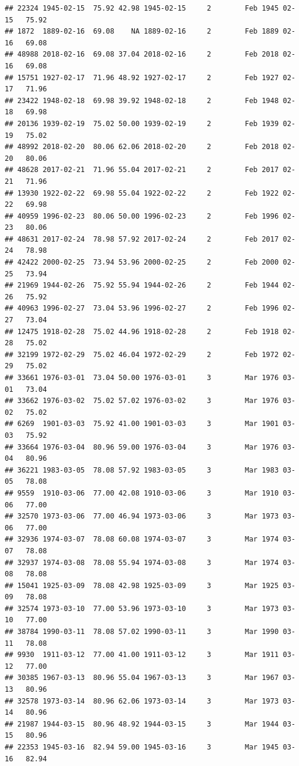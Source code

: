 \documentclass{article}\usepackage[]{graphicx}\usepackage[]{color}
\makeatletter
\newenvironment{kframe}{%
 \def\at@end@of@kframe{}%
 \ifinner\ifhmode%
  \def\at@end@of@kframe{\end{minipage}}%
  \begin{minipage}{\columnwidth}%
 \fi\fi%
 \def\FrameCommand##1{\hskip\@totalleftmargin \hskip-\fboxsep
 \colorbox{shadecolor}{##1}\hskip-\fboxsep
     \hskip-\linewidth \hskip-\@totalleftmargin \hskip\columnwidth}%
 \MakeFramed {\advance\hsize-\width
   \@totalleftmargin\z@ \linewidth\hsize
   \@setminipage}}%
 {\par\unskip\endMakeFramed%
 \at@end@of@kframe}
\newenvironment{knitrout}{}{} %
\makeatother
\begin{document}
\begin{knitrout}
\begin{kframe}
\begin{verbatim}
## 22324 1945-02-15  75.92 42.98 1945-02-15     2        Feb 1945 02-15   75.92
## 1872  1889-02-16  69.08    NA 1889-02-16     2        Feb 1889 02-16   69.08
## 48988 2018-02-16  69.08 37.04 2018-02-16     2        Feb 2018 02-16   69.08
## 15751 1927-02-17  71.96 48.92 1927-02-17     2        Feb 1927 02-17   71.96
## 23422 1948-02-18  69.98 39.92 1948-02-18     2        Feb 1948 02-18   69.98
## 20136 1939-02-19  75.02 50.00 1939-02-19     2        Feb 1939 02-19   75.02
## 48992 2018-02-20  80.06 62.06 2018-02-20     2        Feb 2018 02-20   80.06
## 48628 2017-02-21  71.96 55.04 2017-02-21     2        Feb 2017 02-21   71.96
## 13930 1922-02-22  69.98 55.04 1922-02-22     2        Feb 1922 02-22   69.98
## 40959 1996-02-23  80.06 50.00 1996-02-23     2        Feb 1996 02-23   80.06
## 48631 2017-02-24  78.98 57.92 2017-02-24     2        Feb 2017 02-24   78.98
## 42422 2000-02-25  73.94 53.96 2000-02-25     2        Feb 2000 02-25   73.94
## 21969 1944-02-26  75.92 55.94 1944-02-26     2        Feb 1944 02-26   75.92
## 40963 1996-02-27  73.04 53.96 1996-02-27     2        Feb 1996 02-27   73.04
## 12475 1918-02-28  75.02 44.96 1918-02-28     2        Feb 1918 02-28   75.02
## 32199 1972-02-29  75.02 46.04 1972-02-29     2        Feb 1972 02-29   75.02
## 33661 1976-03-01  73.04 50.00 1976-03-01     3        Mar 1976 03-01   73.04
## 33662 1976-03-02  75.02 57.02 1976-03-02     3        Mar 1976 03-02   75.02
## 6269  1901-03-03  75.92 41.00 1901-03-03     3        Mar 1901 03-03   75.92
## 33664 1976-03-04  80.96 59.00 1976-03-04     3        Mar 1976 03-04   80.96
## 36221 1983-03-05  78.08 57.92 1983-03-05     3        Mar 1983 03-05   78.08
## 9559  1910-03-06  77.00 42.08 1910-03-06     3        Mar 1910 03-06   77.00
## 32570 1973-03-06  77.00 46.94 1973-03-06     3        Mar 1973 03-06   77.00
## 32936 1974-03-07  78.08 60.08 1974-03-07     3        Mar 1974 03-07   78.08
## 32937 1974-03-08  78.08 55.94 1974-03-08     3        Mar 1974 03-08   78.08
## 15041 1925-03-09  78.08 42.98 1925-03-09     3        Mar 1925 03-09   78.08
## 32574 1973-03-10  77.00 53.96 1973-03-10     3        Mar 1973 03-10   77.00
## 38784 1990-03-11  78.08 57.02 1990-03-11     3        Mar 1990 03-11   78.08
## 9930  1911-03-12  77.00 41.00 1911-03-12     3        Mar 1911 03-12   77.00
## 30385 1967-03-13  80.96 55.04 1967-03-13     3        Mar 1967 03-13   80.96
## 32578 1973-03-14  80.96 62.06 1973-03-14     3        Mar 1973 03-14   80.96
## 21987 1944-03-15  80.96 48.92 1944-03-15     3        Mar 1944 03-15   80.96
## 22353 1945-03-16  82.94 59.00 1945-03-16     3        Mar 1945 03-16   82.94

\end{verbatim}
\end{kframe}
\end{knitrout}
\end{document}
